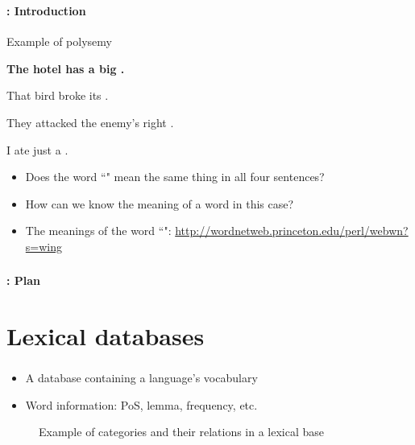 \documentclass[xcolor=table]{beamer}
\subtitle[07- Word semantics]{Chapter 07\\Word semantics}
\begin{document}
	
\begin{frame}
	\frametitle{\inserttitle}
	\framesubtitle{\insertshortsubtitle: Introduction}

	\begin{exampleblock}{Example of polysemy}
		\begin{center}
			\Large\bfseries
				The hotel has a big .
				 
				That bird broke its .
				
				They attacked the enemy's right .
				
				I ate just a .
		\end{center}
	\end{exampleblock}
	
	\begin{itemize}
		\item Does the word ``" mean the same thing in all four sentences?
		\item How can we know the meaning of a word in this case?
		\item The meanings of the word ``": \url{http://wordnetweb.princeton.edu/perl/webwn?s=wing}
	\end{itemize}

\end{frame}

\begin{frame}
	\frametitle{\inserttitle}
	\framesubtitle{\insertshortsubtitle: Plan}

	\begin{multicols}{2}
	\tableofcontents
	\end{multicols}

\end{frame}

\section{Lexical databases}

\begin{frame}
	\frametitle{\insertshortsubtitle}
	\framesubtitle{\insertsection}

	\begin{itemize}
		\item A database containing a language's vocabulary
		\item Word information: PoS, lemma, frequency, etc.
	\end{itemize}

	\begin{figure}
		\centering 
		\caption{Example of categories and their relations in a lexical base \cite{2019-white-al}}
	\end{figure}
	
\end{frame}
\end{document}
